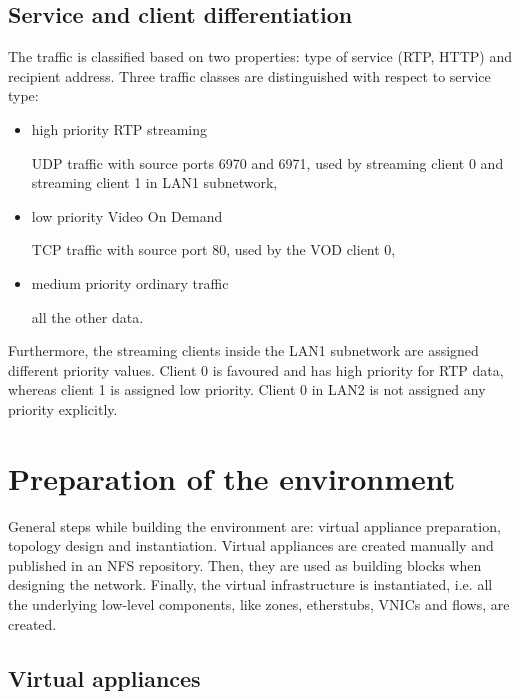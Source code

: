 \documentclass[11pt]{book}
\begin{document}
      \subsection{Service and client differentiation}
      \label{sub:uc:diff}

        The traffic is classified based on two properties: type of service (RTP, HTTP) and recipient address. Three
        traffic classes are distinguished with respect to service type:

        \begin{itemize}

          \item high priority RTP streaming

                UDP traffic with source ports 6970 and 6971, used by streaming client 0
                and streaming client 1 in LAN1 subnetwork,

          \item low priority Video On Demand
          
                TCP traffic with source port 80, used by the VOD client 0,

          \item medium priority ordinary traffic
          
                all the other data.

        \end{itemize}

        Furthermore, the streaming clients inside the LAN1 subnetwork are assigned different priority values. Client 0 is
        favoured and has high priority for RTP data, whereas client 1 is assigned low priority. Client 0 in LAN2
        is not assigned any priority explicitly.


    \section{Preparation of the environment}
    \label{sec:uc:prep}

      General steps while building the environment are: virtual appliance preparation, topology design and
      instantiation. Virtual appliances are created manually and published in an NFS repository. Then, they are used as
      building blocks when designing the network. Finally, the virtual infrastructure is instantiated, i.e. all the
      underlying low-level components, like zones, etherstubs, VNICs and flows, are created.


      \subsection{Virtual appliances}
      \label{ssub:case:prep:va}
\end{document}
